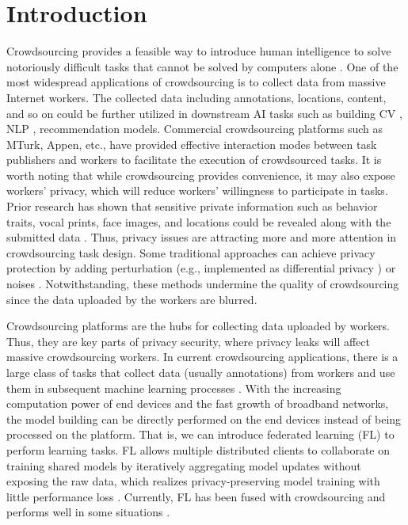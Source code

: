 \documentclass[final,1p,times]{elsarticle}
\begin{document}
\section{Introduction}
Crowdsourcing provides a feasible way to introduce human intelligence to solve notoriously difficult tasks that cannot be solved by computers alone \citep{Vaughan2017MakingBU}. One of the most widespread applications of crowdsourcing is to collect data from massive Internet workers. The collected data including annotations, locations, content, and so on could be further utilized in downstream AI tasks such as building CV \citep{Kovashka2016CrowdsourcingIC}, NLP \citep{Wang2013PerspectivesOC}, recommendation \citep{Lin2023CompetitiveGI} models. Commercial crowdsourcing platforms such as MTurk, Appen, etc., have provided effective interaction modes between task publishers and workers to facilitate the execution of crowdsourced tasks. It is worth noting that while crowdsourcing provides convenience, it may also expose workers' privacy, which will reduce workers' willingness to participate in tasks. Prior research has shown that sensitive private information such as behavior traits, vocal prints, face images, and locations could be revealed along with the submitted data \citep{xia2020privacy,Tong2020FederatedLI}. Thus, privacy issues are attracting more and more attention in crowdsourcing task design. Some traditional approaches can achieve privacy protection by adding perturbation (e.g., implemented as differential privacy \citep{luo2016incentive,wang2022pps}) or noises \citep{to2018ppo,huang2020traffic}. Notwithstanding, these methods undermine the quality of crowdsourcing since the data uploaded by the workers are blurred.

Crowdsourcing platforms are the hubs for collecting data uploaded by workers. Thus, they are key parts of privacy security, where privacy leaks will affect massive crowdsourcing workers. In current crowdsourcing applications, there is a large class of tasks that collect data (usually annotations) from workers and use them in subsequent machine learning processes \citep{Sheng2019MachineLW}. With the increasing computation power of end devices and the fast growth of broadband networks, the model building can be directly performed on the end devices instead of being processed on the platform. That is, we can introduce federated learning (FL) \citep{mcmahan2017communication} to perform learning tasks. FL allows multiple distributed clients to collaborate on training shared models by iteratively aggregating model updates without exposing the raw data, which realizes privacy-preserving model training with little performance loss \citep{Yang2019FederatedML,Gao2022ASO}. Currently, FL has been fused with crowdsourcing and performs well in some situations \citep{Pandey2019ACF,Tong2020FederatedLI,zhang2021enabling}.
\end{document}
